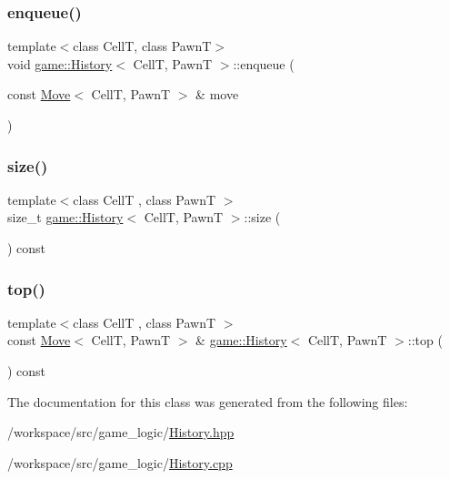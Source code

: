 \subsubsection{\texorpdfstring{enqueue()}{enqueue()}}
{\footnotesize\ttfamily template$<$class CellT, class PawnT$>$ \\
void \hyperlink{classgame_1_1_history}{game\+::\+History}$<$ CellT, PawnT $>$\+::enqueue (\begin{DoxyParamCaption}\item[{const \hyperlink{structgame_1_1_move}{Move}$<$ CellT, PawnT $>$ \&}]{move }\end{DoxyParamCaption})}

\mbox{\label{classgame_1_1_history_a76232fe6378cb99627bf3836bb49b2f9}} 
\subsubsection{\texorpdfstring{size()}{size()}}
{\footnotesize\ttfamily template$<$class CellT , class PawnT $>$ \\
size\+\_\+t \hyperlink{classgame_1_1_history}{game\+::\+History}$<$ CellT, PawnT $>$\+::size (\begin{DoxyParamCaption}{ }\end{DoxyParamCaption}) const}

\mbox{\label{classgame_1_1_history_aae955cf1457fcee4031d0dd6aac480aa}} 
\subsubsection{\texorpdfstring{top()}{top()}}
{\footnotesize\ttfamily template$<$class CellT , class PawnT $>$ \\
const \hyperlink{structgame_1_1_move}{Move}$<$ CellT, PawnT $>$ \& \hyperlink{classgame_1_1_history}{game\+::\+History}$<$ CellT, PawnT $>$\+::top (\begin{DoxyParamCaption}{ }\end{DoxyParamCaption}) const}



The documentation for this class was generated from the following files\+:\begin{DoxyCompactItemize}
\item 
/workspace/src/game\+\_\+logic/\hyperlink{_history_8hpp}{History.\+hpp}\item 
/workspace/src/game\+\_\+logic/\hyperlink{_history_8cpp}{History.\+cpp}\end{DoxyCompactItemize}
